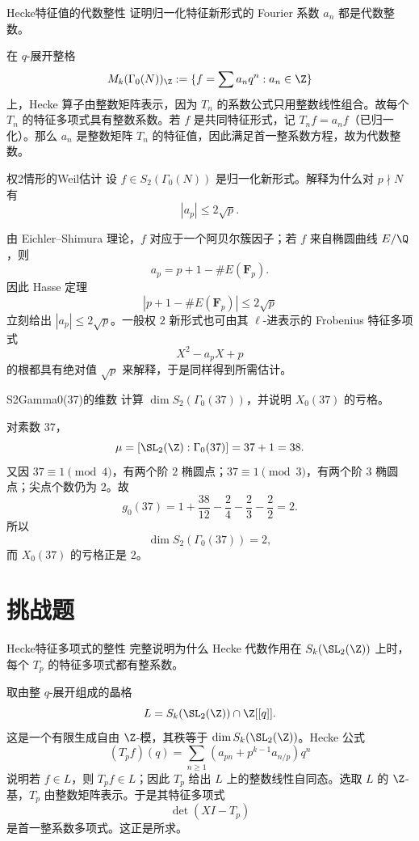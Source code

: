 \begin{problem}{Hecke特征值的代数整性}
证明归一化特征新形式的 Fourier 系数 $a_n$ 都是代数整数。
\end{problem}
\begin{solution}
在 $q$-展开整格
\[
M_k(\Gamma_0(N))_{\Z}:=\{f=\sum a_nq^n: a_n\in\Z\}
\]
上，Hecke 算子由整数矩阵表示，因为 $T_n$ 的系数公式只用整数线性组合。故每个 $T_n$ 的特征多项式具有整数系数。若 $f$ 是共同特征形式，记 $T_nf=a_n f$（已归一化）。那么 $a_n$ 是整数矩阵 $T_n$ 的特征值，因此满足首一整系数方程，故为代数整数。
\end{solution}

\begin{problem}{权2情形的Weil估计}
设 $f\in S_2(\Gamma_0(N))$ 是归一化新形式。解释为什么对 $p\nmid N$ 有
\[
|a_p|\le 2\sqrt p.
\]
\end{problem}
\begin{solution}
由 Eichler--Shimura 理论，$f$ 对应于一个阿贝尔簇因子；若 $f$ 来自椭圆曲线 $E/\Q$，则
\[
a_p=p+1-\#E(\mathbf{F}_p).
\]
因此 Hasse 定理
\[
|p+1-\#E(\mathbf{F}_p)|\le2\sqrt p
\]
立刻给出 $|a_p|\le2\sqrt p$。一般权 $2$ 新形式也可由其 $\ell$-进表示的 Frobenius 特征多项式
\[
X^2-a_pX+p
\]
的根都具有绝对值 $\sqrt p$ 来解释，于是同样得到所需估计。
\end{solution}

\begin{problem}{S2Gamma0(37)的维数}
计算 $\dim S_2(\Gamma_0(37))$，并说明 $X_0(37)$ 的亏格。
\end{problem}
\begin{solution}
对素数 $37$，
\[
\mu=[\SL_2(\Z):\Gamma_0(37)]=37+1=38.
\]
又因 $37\equiv1\pmod4$，有两个阶 $2$ 椭圆点；$37\equiv1\pmod3$，有两个阶 $3$ 椭圆点；尖点个数仍为 $2$。故
\[
g_0(37)=1+\frac{38}{12}-\frac24-\frac23-\frac22=2.
\]
所以
\[
\dim S_2(\Gamma_0(37))=2,
\]
而 $X_0(37)$ 的亏格正是 $2$。
\end{solution}

\section{挑战题 \hard}

\begin{problem}{Hecke特征多项式的整性}
完整说明为什么 Hecke 代数作用在 $S_k(\SL_2(\Z))$ 上时，每个 $T_p$ 的特征多项式都有整系数。
\end{problem}
\begin{solution}
取由整 $q$-展开组成的晶格
\[
L=S_k(\SL_2(\Z))\cap \Z[[q]].
\]
这是一个有限生成自由 $\Z$-模，其秩等于 $\dim S_k(\SL_2(\Z))$。Hecke 公式
\[
(T_pf)(q)=\sum_{n\ge1}(a_{pn}+p^{k-1}a_{n/p})q^n
\]
说明若 $f\in L$，则 $T_pf\in L$；因此 $T_p$ 给出 $L$ 上的整数线性自同态。选取 $L$ 的 $\Z$-基，$T_p$ 由整数矩阵表示。于是其特征多项式
\[
\det(XI-T_p)
\]
是首一整系数多项式。这正是所求。
\end{solution}

